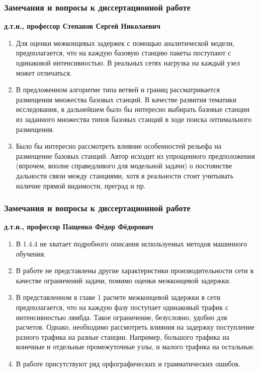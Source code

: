 \begin{frame}
    \frametitle{Замечания и вопросы к диссертационной работе}
    \fontsize{8pt}{7.2}\selectfont
    \textbf{д.т.н., профессор Степанов Сергей Николаевич}

    \bigskip

    \begin{enumerate}
        \item Для оценки межконцевых задержек с помощью аналитической модели, предполагается, что на каждую базовую станцию пакеты поступают с одинаковой интенсивностью. В реальных сетях нагрузка на каждый узел может отличаться.
        \item В предложенном алгоритме типа ветвей и границ рассматривается размещения множества базовых станций. В качестве развития тематики исследования, в дальнейшем было бы интересно выбирать базовые станции из заданного множества типов базовых станций в ходе поиска оптимального размещения.
        \item Было бы интересно рассмотреть влияние особенностей рельефа на размещение базовых станций. Автор исходит из упрощенного предположения (впрочем, вполне справедливого для модельной задачи) о постоянстве дальности связи между станциями, хотя в реальности стоит учитывать наличие прямой видимости, преград и пр.
        
    \end{enumerate}
\end{frame}


\begin{frame}
    \frametitle{Замечания и вопросы к диссертационной работе}
    \fontsize{8pt}{7.2}\selectfont
    \textbf{д.т.н., профессор Пащенко Фёдор Фёдорович}

    \bigskip

    \begin{enumerate}
        \item В 1.4.4 не хватает подробного описания используемых методов машинного обучения.
        \item В работе не представлены другие характеристики производительности сети в качестве ограничений задачи, помимо оценки межконцевой задержки.
        \item В представленном в главе 1 расчете межконцевой задержки в сети предполагается, что на каждую фазу поступает одинаковый трафик с интенсивностью лямбда. Такое ограничение, безусловно, удобно для расчетов. Однако, необходимо рассмотреть влияния на задержку поступление разного трафика на разные станции. Например, большого трафика на конечные и отдельные промежуточные узлы, и малого трафика на остальные.
        \item В работе присутствуют ряд орфографических и грамматических ошибок.
        
    \end{enumerate}
\end{frame}



